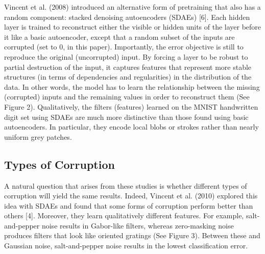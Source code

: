 \documentclass{article} %
\begin{document}
Vincent et al. (2008) introduced an alternative form of pretraining that also has a random component: stacked denoising autoencoders (SDAEs) [6]. Each hidden layer is trained to reconstruct either the visible or hidden units of the layer before it like a basic autoencoder, except that a random subset of the inputs are corrupted (set to 0, in this paper). Importantly, the error objective is still to reproduce the original (uncorrupted) input. By forcing a layer to be robust to partial destruction of the input, it captures features that represent more stable structures (in terms of dependencies and regularities) in the distribution of the data. In other words, the model has to learn the relationship between the missing (corrupted) inputs and the remaining values in order to reconstruct them (See Figure 2). Qualitatively, the filters (features) learned on the MNIST handwritten digit set using SDAEs are much more distinctive than those found using basic autoencoders. In particular, they encode local blobs or strokes rather than nearly uniform grey patches.

\subsection{Types of Corruption}

A natural question that arises from these studies is whether different types of corruption will yield the same results. Indeed, Vincent et al. (2010) explored this idea with SDAEs and found that some forms of corruption perform better than others [4]. Moreover, they learn qualitatively different features. For example, salt-and-pepper noise results in Gabor-like filters, whereas zero-masking noise produces filters that look like oriented gratings (See Figure 3). Between these and Gaussian noise, salt-and-pepper noise results in the lowest classification error.
\end{document}
